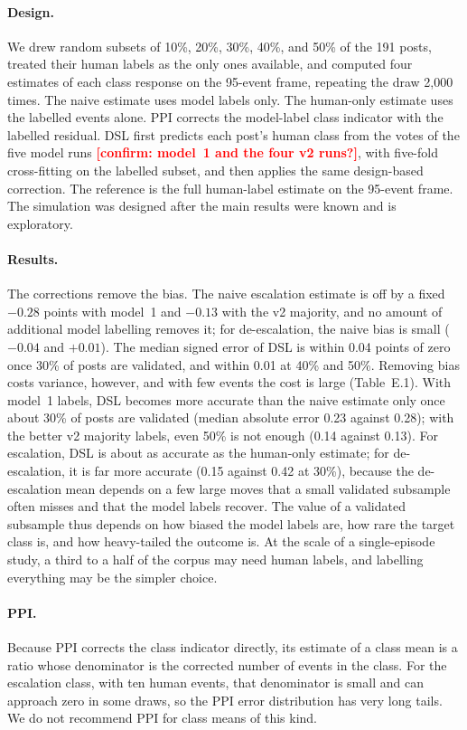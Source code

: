 \documentclass[11pt]{article}
\newcommand{\chk}[1]{\textcolor{red}{\textbf{[#1]}}}
\begin{document}
\paragraph{Design.} We drew random subsets of 10\%, 20\%, 30\%, 40\%, and 50\% of the 191 posts, treated their human labels as the only ones available, and computed four estimates of each class response on the 95-event frame, repeating the draw 2,000 times. The naive estimate uses model labels only. The human-only estimate uses the labelled events alone. PPI \citep{angelopoulos2023} corrects the model-label class indicator with the labelled residual. DSL \citep{egami2023} first predicts each post's human class from the votes of the five model runs \chk{confirm: model~1 and the four v2 runs?}, with five-fold cross-fitting on the labelled subset, and then applies the same design-based correction. The reference is the full human-label estimate on the 95-event frame. The simulation was designed after the main results were known and is exploratory.

\paragraph{Results.} The corrections remove the bias. The naive escalation estimate is off by a fixed $-0.28$ points with model~1 and $-0.13$ with the v2 majority, and no amount of additional model labelling removes it; for de-escalation, the naive bias is small ($-0.04$ and $+0.01$). The median signed error of DSL is within 0.04 points of zero once 30\% of posts are validated, and within 0.01 at 40\% and 50\%. Removing bias costs variance, however, and with few events the cost is large (Table~E.1). With model~1 labels, DSL becomes more accurate than the naive estimate only once about 30\% of posts are validated (median absolute error 0.23 against 0.28); with the better v2 majority labels, even 50\% is not enough (0.14 against 0.13). For escalation, DSL is about as accurate as the human-only estimate; for de-escalation, it is far more accurate (0.15 against 0.42 at 30\%), because the de-escalation mean depends on a few large moves that a small validated subsample often misses and that the model labels recover. The value of a validated subsample thus depends on how biased the model labels are, how rare the target class is, and how heavy-tailed the outcome is. At the scale of a single-episode study, a third to a half of the corpus may need human labels, and labelling everything may be the simpler choice.

\paragraph{PPI.} Because PPI corrects the class indicator directly, its estimate of a class mean is a ratio whose denominator is the corrected number of events in the class. For the escalation class, with ten human events, that denominator is small and can approach zero in some draws, so the PPI error distribution has very long tails. We do not recommend PPI for class means of this kind.
\end{document}
